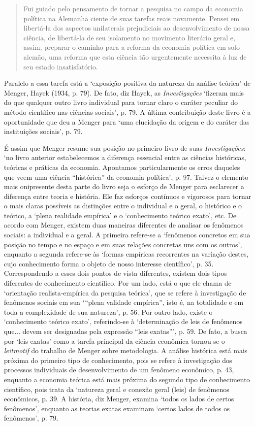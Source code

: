 \documentclass[12pt]{article}
\begin{document}
\begin{quote}
Fui guiado pelo pensamento de tornar a pesquisa no campo da economia política na Alemanha ciente de suas tarefas reais novamente. Pensei em libertá-la dos aspectos unilaterais prejudiciais ao desenvolvimento de nossa ciência, de libertá-la de seu isolamento no movimento literário geral e, assim, preparar o caminho para a reforma da economia política em solo alemão, uma reforma que esta ciência tão urgentemente necessita à luz de seu estado insatisfatório.
\end{quote}

Paralelo a essa tarefa está a ‘exposição positiva da natureza da análise teórica’ de Menger, Hayek (1934, p. 79). De fato, diz Hayek, as \textit{Investigações} ‘fizeram mais do que qualquer outro livro individual para tornar claro o caráter peculiar do método científico nas ciências sociais’, p. 79. A última contribuição deste livro é a oportunidade que deu a Menger para ‘uma elucidação da origem e do caráter das instituições sociais’, p. 79.

É assim que Menger resume sua posição no primeiro livro de suas \textit{Investigações}: ‘no livro anterior estabelecemos a diferença essencial entre as ciências históricas, teóricas e práticas da economia. Apontamos particularmente os erros daqueles que veem uma ciência “histórica” da economia política’, p. 97. Talvez o elemento mais onipresente desta parte do livro seja o esforço de Menger para esclarecer a diferença entre teoria e história. Ele faz esforços contínuos e vigorosos para tornar o mais claras possíveis as distinções entre o individual e o geral, o histórico e o teórico, a ‘plena realidade empírica’ e o ‘conhecimento teórico exato’, etc. De acordo com Menger, existem duas maneiras diferentes de analisar os fenômenos sociais: a individual e a geral. A primeira refere-se a ‘fenômenos concretos em sua posição no tempo e no espaço e em suas relações concretas uns com os outros’, enquanto a segunda refere-se às ‘formas empíricas recorrentes na variação destes, cujo conhecimento forma o objeto de nosso interesse científico’, p. 35. Correspondendo a esses dois pontos de vista diferentes, existem dois tipos diferentes de conhecimento científico. Por um lado, está o que ele chama de ‘orientação realista-empírica da pesquisa teórica’, que se refere à investigação de fenômenos sociais em sua ‘“plena validade empírica”, isto é, na totalidade e em toda a complexidade de sua natureza’, p. 56. Por outro lado, existe o ‘conhecimento teórico exato’, referindo-se à ‘determinação de leis de fenômenos que... devem ser designadas pela expressão “leis exatas”’, p. 59. De fato, a busca por ‘leis exatas’ como a tarefa principal da ciência econômica tornou-se o \textit{leitmotif} do trabalho de Menger sobre metodologia. A análise histórica está mais próxima do primeiro tipo de conhecimento, pois se refere à investigação dos processos individuais de desenvolvimento de um fenômeno econômico, p. 43, enquanto a economia teórica está mais próxima do segundo tipo de conhecimento científico, pois trata da ‘natureza geral e conexão geral (leis) de fenômenos econômicos, p. 39. A história, diz Menger, examina ‘todos os lados de certos fenômenos’, enquanto as teorias exatas examinam ‘certos lados de todos os fenômenos’, p. 79.
\end{document}

